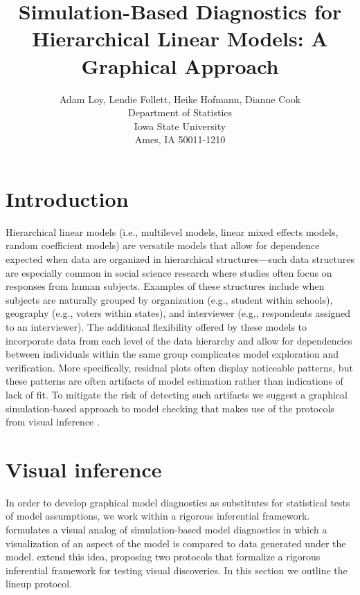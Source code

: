 \documentclass{article} %
\title{Simulation-Based Diagnostics for Hierarchical Linear Models: A Graphical Approach}
\author{Adam Loy, Lendie Follett, Heike Hofmann, Dianne Cook\\
	Department of Statistics\\
	Iowa State University\\
	Ames, IA 50011-1210
}
\begin{document}
\maketitle
\section{Introduction}

Hierarchical linear models (i.e., multilevel models, linear mixed effects models, random coefficient models) are versatile models that allow for dependence expected when data are organized in hierarchical structures---such data structures are especially common in social science research where studies often focus on responses from human subjects. Examples of these structures include when subjects are naturally grouped by organization (e.g., student within schools), geography (e.g., voters within states), and interviewer (e.g., respondents assigned to an interviewer). The additional flexibility offered by these models to incorporate data from each level of the data hierarchy and allow for dependencies between individuals within the same group complicates model exploration and verification. More specifically, residual plots often display noticeable patterns, but these patterns are often artifacts of model estimation rather than indications of lack of fit. To mitigate the risk of detecting such artifacts we suggest a graphical simulation-based approach to model checking that makes use of the protocols from visual inference \citep{Buja:2009hp}.


\section{Visual inference}\label{sec:vi}
In order to develop graphical model diagnostics as substitutes for statistical tests of model assumptions, we work within a rigorous inferential framework. \cite{Gelman:2004gg} formulates a visual analog of simulation-based model diagnostics in which a visualization of an aspect of the model is compared to data generated under the model. \cite{Buja:2009hp} extend this idea, proposing two protocols that formalize a rigorous inferential framework for testing visual discoveries. In this section we outline the lineup protocol.
\end{document}
